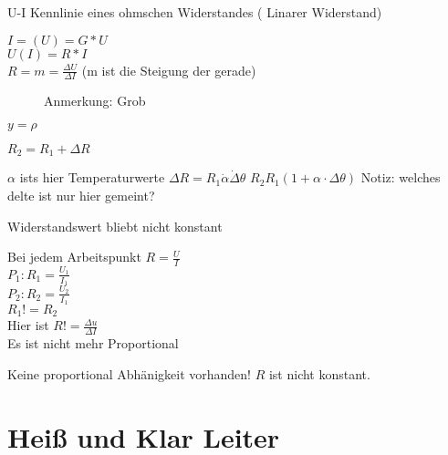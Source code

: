 
U-I Kennlinie eines ohmschen Widerstandes ( Linarer Widerstand)

\begin{figure}[h!]
  \begin{center}
\end{center}
\end{figure}
$I=(U) = G * U $\\
$U(I) = R * I $\\
$ R = m =\frac{\Delta U}{\Delta I} $ (m ist die Steigung der gerade)\\
\begin{figure}[h!]
  \begin{center}
  Anmerkung: Grob
  \end{center}
\end{figure}

$y=\rho$

$R_2 = R_1 + \Delta R$

$\alpha $ ists hier Temperaturwerte 
$\Delta R = R_1 \dot \alpha \dot \Delta \theta$
$R_2 R_1 (1 + \alpha \cdot \Delta \theta) $
Notiz: welches delte ist nur hier gemeint?

Widerstandswert bliebt nicht konstant

Bei jedem Arbeitspunkt $R = \frac{U}{I}$\\
$ P_1: R_1 = \frac{U_1}{I_1} $\\
$ P_2: R_2 = \frac{U_2}{I_1} $\\

$ R_1 != R_2 $\\

Hier ist $R != \frac{\Delta u}{\Delta I} $\\

Es ist nicht mehr Proportional

Keine proportional Abhänigkeit vorhanden!
$R$ ist nicht konstant.

\section{Heiß und Klar Leiter}

